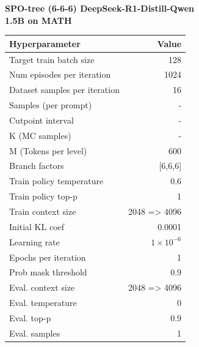 \begin{minipage}[t]{0.48\textwidth}
    \centering
    \textbf{SPO-tree (6-6-6) DeepSeek-R1-Distill-Qwen \\ 1.5B on MATH}\\[4pt]
    \begin{tabular}{@{}lr@{}}
        \toprule
        Hyperparameter & Value \\ \midrule
        Target train batch size & 128 \\ 
        Num episodes per iteration & 1024 \\ 
        Dataset samples per iteration & 16 \\
        Samples (per prompt) & - \\
        Cutpoint interval & - \\
        K (MC samples) & - \\
        M (Tokens per level) & 600 \\
        Branch factors & [6,6,6] \\
        Train policy temperature & 0.6 \\
        Train policy top-p & 1 \\
        Train context size & 2048 => 4096 \\
        Initial KL coef & 0.0001 \\
        Learning rate & $1\times10^{-6}$ \\
        Epochs per iteration & 1 \\
        Prob mask threshold & 0.9 \\
        Eval. context size & 2048 => 4096 \\
        Eval. temperature & 0 \\
        Eval. top-p & 0.9 \\
        Eval. samples & 1 \\
        \bottomrule
    \end{tabular}
\end{minipage}

